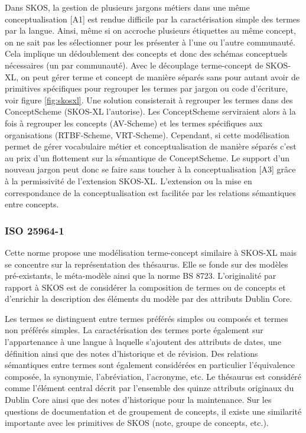 Dans SKOS, la gestion de plusieurs jargons métiers dans une même conceptualisation [A1] est rendue difficile par la caractérisation simple des termes par la langue. 
Ainsi, même si on accroche plusieurs étiquettes au même concept, on ne sait pas les sélectionner pour les présenter à l'une ou l'autre communauté. 
Cela implique un dédoublement des concepts et donc des schémas conceptuels nécessaires (un par communauté).%
Avec le découplage terme-concept de SKOS-XL, on peut gérer terme et concept de manière séparés sans pour autant avoir de primitives spécifiques pour regrouper les termes par jargon ou code d'écriture, voir figure \ref{fig:skosxl}. 
Une solution consisterait à regrouper les termes dans des ConceptScheme (SKOS-XL l'autorise).
Les ConceptScheme serviraient alors à la fois à regrouper les concepts (AV-Scheme) et les termes spécifiques aux organisations (RTBF-Scheme, VRT-Scheme). 
Cependant, si cette modélisation permet de gérer vocabulaire métier et conceptualisation de manière séparés c'est au prix d'un flottement sur la sémantique de ConceptScheme. 
Le support d'un nouveau jargon peut donc se faire sans toucher à la conceptualisation [A3] grâce à la permissivité de l'extension SKOS-XL. 
L'extension ou la mise en correspondance de la conceptualisation est facilitée par les relations sémantiques entre concepts.


\subsubsection*{ISO 25964-1}
Cette norme propose une modélisation terme-concept similaire à SKOS-XL mais se concentre sur la représentation des thésaurus. 
Elle se fonde sur des modèles pré-existants, le méta-modèle \cite{Vandenbussche2009} ainsi que la norme BS 8723. 
L'originalité par rapport à SKOS est de considérer la composition de termes ou de concepts et d'enrichir la description des éléments du modèle par des attributs Dublin Core.

Les termes se distinguent entre termes préférés simples ou composés et termes non préférés simples. 
La caractérisation des termes porte également sur l'appartenance à une langue à laquelle s'ajoutent des attributs de dates, une définition ainsi que des notes d'historique et de révision. 
Des relations sémantiques entre termes sont également considérées en particulier l'équivalence composée, la synonymie, l'abréviation, l'acronyme, etc. 
Le thésaurus est considéré comme l'élément central décrit par l'ensemble des quinze attributs originaux du Dublin Core ainsi que des notes d'historique pour la maintenance. 
Sur les questions de documentation et de groupement de concepts, il existe une similarité importante avec les primitives de SKOS (note, groupe de concepts, etc.).\\

